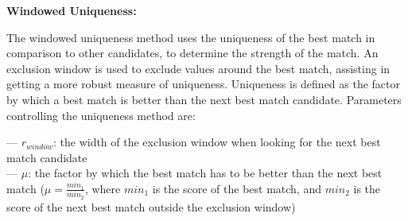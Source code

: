 \parbox{\textwidth}{\textbf{Windowed Uniqueness:}} \smallskip
\parbox{\textwidth}{The windowed uniqueness method uses the uniqueness of the best match in comparison to other candidates, to determine the strength of the match. An exclusion window is used to exclude values around the best match, assisting in getting a more robust measure of uniqueness. Uniqueness is defined as the factor by which a best match is better than the next best match candidate. Parameters controlling the uniqueness method are:}
\parbox{\textwidth}{--- $r_{window}$: the width of the exclusion window when looking for the next best match candidate \\ --- $\mu$: the factor by which the best match has to be better than the next best match ($\mu=\frac{min_1}{min_2}$, where $min_1$ is the score of the best match, and $min_2$ is the score of the next best match outside the exclusion window)}
\smallskip
